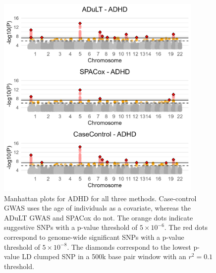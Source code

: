 \begin{figure}[h] 
	\centering
	\includegraphics[width=10cm]{results/adult_manhattanPlot_ADHD}
	\caption[Manhattan plots from GWAS with the ADuLT phenotype, SPACox, and case-control status for ADHD]{Manhattan plots for ADHD for all three methods. Case-control GWAS uses the age of individuals as a covariate, whereas the ADuLT GWAS and SPACox do not. The orange dots indicate suggestive SNPs with a p-value threshold of $ 5 \times 10^{-6} $. The red dots correspond to genome-wide significant SNPs with a p-value threshold of $ 5 \times 10^{-8} $. The diamonds correspond to the lowest p-value LD clumped SNP in a 500k base pair window with an $ r^2 = 0.1 $ threshold.}
	\label{fig:adult_ADHD}
\end{figure}

